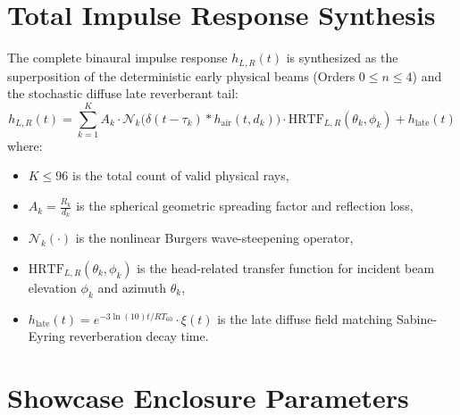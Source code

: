 \documentclass[11pt,a4paper]{article}
\begin{document}
\section{Total Impulse Response Synthesis}

The complete binaural impulse response $h_{L,R}(t)$ is synthesized as the superposition of the deterministic early physical beams (Orders $0 \le n \le 4$) and the stochastic diffuse late reverberant tail:
\begin{equation}
h_{L,R}(t) = \sum_{k=1}^{K} A_k \cdot \mathcal{N}_k\Big( \delta(t - \tau_k) * h_{\text{air}}(t, d_k) \Big) \cdot \text{HRTF}_{L,R}(\theta_k, \phi_k) + h_{\text{late}}(t)
\end{equation}
where:
\begin{itemize}
    \item $K \le 96$ is the total count of valid physical rays,
    \item $A_k = \frac{R_k}{d_k}$ is the spherical geometric spreading factor and reflection loss,
    \item $\mathcal{N}_k(\cdot)$ is the nonlinear Burgers wave-steepening operator,
    \item $\text{HRTF}_{L,R}(\theta_k, \phi_k)$ is the head-related transfer function for incident beam elevation $\phi_k$ and azimuth $\theta_k$,
    \item $h_{\text{late}}(t) = e^{-3 \ln(10) t / RT_{60}} \cdot \xi(t)$ is the late diffuse field matching Sabine-Eyring reverberation decay time.
\end{itemize}

\section{Showcase Enclosure Parameters}
\end{document}
